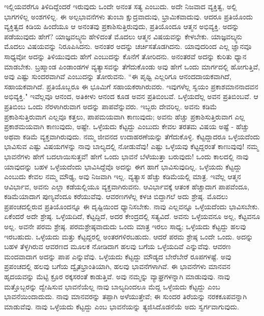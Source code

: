 \newpage

ಇಲ್ಲಿಯವರೆಗೂ ತಿಳಿದಿದ್ದೆಂದರೆ ಇರುವುದು ಒಂದೇ ಅನಂತ ಸತ್ಯ ಎಂಬುದು. ಅದೇ ನಿಜವಾದ ವ್ಯಕ್ತಿತ್ವ, ಅಲ್ಲಿ ಭಾಗಗಳಿಲ್ಲ ಅಂಶಗಳಿಲ್ಲ. ಈ ಅಲ್ಪಭಾವನೆಗಳು ತುಂಬಾ ಕ್ಷುದ್ರವಾದುವು, ಭ್ರಾಮಿಕವಾದುವು. ಆದರೂ ಪ್ರತಿಯೊಂದು ವ್ಯಕ್ತಿತ್ವದ ಕಿಡಿಯ ಹಿಂದೆಯೂ ಆ ಅನಂತವು ಪ್ರಕಾಶಿಸುತ್ತಿರುವುದು, ಪ್ರತಿಯೊಂದೂ ಆತ್ಮನ ಅಭಿವ್ಯಕ್ತಿ. ಅದನ್ನು ಪಡೆಯುವುದು ಹೇಗೆ? ಯಾಜ್ಞವಲ್ಕ್ಯನು ಹೇಳಿದಂತೆ ಮೊದಲು ಆತ್ಮನ ವಿಷಯವನ್ನು ಕೇಳಬೇಕು. ಯಾಜ್ಞವಲ್ಕ್ಯನು ಮೊದಲು ವಿಷಯವನ್ನು ನಿರೂಪಿಸಿದನು. ಅನಂತರ ಅದನ್ನು ಚರ್ಚಿಸತೊಡಗಿದನು. ಯಾವುದರಿಂದ ಎಲ್ಲ ಜ್ಞಾನವೂ ಸಾಧ್ಯವೋ ಅದನ್ನು ತಿಳಿಯುವುದು ಹೇಗೆ ಎಂಬುದನ್ನು ಕೊನೆಗೆ ತೋರಿದನು. ಅನಂತರವೆ ಅದನ್ನು ಕುರಿತು ಧ್ಯಾನ ಮಾಡಬೇಕು. ಬ್ರಹ್ಮಾಂಡ ಪಿಂಡಾಂಡಗಳ ವ್ಯತ್ಯಾಸವನ್ನು ತೆಗೆದುಕೊಂಡು ಅವು ಹೇಗೆ ಒಂದು ಮಾರ್ಗದಲ್ಲಿ ಹೋಗುತ್ತಿವೆ, ಅವು ಎಷ್ಟು ಸುಂದರವಾಗಿವೆ ಎಂಬುದನ್ನು ತೋರುವನು. “ಈ ಪೃಥ್ವಿ ಎಲ್ಲರಿಗೂ ಆನಂದದಾಯಕವಾಗಿದೆ, ಸಹಾಯಕವಾಗಿದೆ. ಪ್ರತಿಯೊಬ್ಬರೂ ಈ ಭೂಮಿಗೆ ಸಹಾಯಕರಾಗಿರುವರು. ಇವುಗಳೆಲ್ಲ ಸ್ವಯಂ ಪ್ರಕಾಶಮಾನನಾದವನ ಅಭಿವ್ಯಕ್ತಿ." ಇವೆಲ್ಲವೂ ಆನಂದ, ಅತಿಕೀಳು ಆನಂದ ಕೂಡ ಅವನ ಪ್ರತಿಬಿಂಬವೆ. ಒಳ್ಳೆಯದೆಲ್ಲ ಅವನ ಪ್ರತಿಬಿಂಬವೆ. ಆ ಪ್ರತಿಬಿಂಬ ಒಂದು ನೆರಳಾಗಿರುವಾಗ ಅದನ್ನು ಪಾಪವೆನ್ನುವರು. ಇಬ್ಬರು ದೇವರಿಲ್ಲ. ಅವನು ಕಡಿಮೆ ಪ್ರಕಾಶಿಸುತ್ತಿರುವಾಗ ಎಲ್ಲವೂ ಕತ್ತಲು, ಪಾಪಮಯವಾಗಿ ಕಾಣುವುದು; ಅವನು ಹೆಚ್ಚು ಪ್ರಕಾಶಿಸುತ್ತಿರುವಾಗ ಎಲ್ಲ ಪ್ರಕಾಶಮಯವಾಗಿ ಕಾಣುವುದು, ಅಷ್ಟೇ. ಒಳ್ಳೆಯದು ಕೆಟ್ಟದ್ದು ಎಂಬುದು ಕೇವಲ ತರತಮ ವಿಷಯ ಅಷ್ಟೆ - ಹೆಚ್ಚು ಅಥವಾ ಕಡಿಮೆ ವ್ಯಕ್ತವಾಗಿರುವುದು. ನಮ್ಮ ಜೀವನದ ಉದಾಹರಣೆಯನ್ನು ತೆಗೆದುಕೊಳ್ಳಿ. ಕೆಟ್ಟದ್ದಾದರೂ ಒಳ್ಳೆಯದೆಂದು ಭಾವಿಸುವ ಎಷ್ಟು ವಿಷಯಗಳನ್ನು ನಾವು ಬಾಲ್ಯದಲ್ಲಿ ನೋಡುವೆವು! ಎಷ್ಟು ಒಳ್ಳೆಯವು ಕೆಟ್ಟದ್ದರಂತೆ ಕಾಣುವುವು! ನಮ್ಮ ಭಾವನೆಗಳು ಹೇಗೆ ಬದಲಾಯಿಸುತ್ತವೆ! ಹೇಗೆ ಒಂದು ಭಾವನೆ ಬೆಳೆಯುತ್ತಾ ಬರುವುದು! ಒಂದು ಕಾಲದಲ್ಲಿ ನಾವು ಯಾವುದನ್ನು ಬಹಳ ಒಳ್ಳೆಯದೆಂದು ಭಾವಿಸಿದ್ದೆವೊ ಅದನ್ನು ಈಗ ಹಾಗೆ ಭಾವಿಸುವುದಿಲ್ಲ. ಒಳ್ಳೆಯದು ಕೆಟ್ಟದ್ದು ಎಂಬುದು ಕೇವಲ ನಮ್ಮ ಮೌಢ್ಯ, ಅವು ನಿಜವಾಗಿ ಇಲ್ಲ. ವ್ಯತ್ಯಾಸ ಹೆಚ್ಚು ಕಡಿಮೆಯಲ್ಲಿ ಮಾತ್ರ. ಇವೆಲ್ಲ ಆತ್ಮನ ಆವಿರ್ಭಾವ, ಅವನು ಎಲ್ಲಾ ಕಡೆಯಲ್ಲಿಯೂ ವ್ಯಕ್ತವಾಗಿರುವನು. ಆವಿರ್ಭಾವಕ್ಕೆ ಆತಂಕ ಹೆಚ್ಚಾದಾಗ ಪಾಪವೆಂದೂ, ಕಡಿಮೆಯಾದಾಗ ಪುಣ್ಯವೆಂದೂ ಕರೆಯುವೆವು. ಆವರಣಗಳೆಲ್ಲ ಕಳಚಿ ಬಿದ್ದಾಗಲೆ ಅದು ಶ್ರೇಷ್ಠ. ಮೊದಲು ಪ್ರಪಂಚದಲ್ಲಿರುವ ಪ್ರತಿಯೊಂದನ್ನೂ ಈ ದೃಷ್ಟಿಯಿಂದ ಧ್ಯಾನಿಸಬೇಕು. ನಾವು ಎಲ್ಲವನ್ನೂ ಒಳ್ಳೆಯದೆಂದು ಭಾವಿಸಬೇಕು. ಏಕೆಂದರೆ ಅದೇ ಶ್ರೇಷ್ಠ. ಒಳ್ಳೆಯದಿದೆ, ಕೆಟ್ಟದ್ದಿದೆ, ಅದರ ಕೇಂದ್ರದಲ್ಲಿ ಸತ್ಯವಿದೆ. ಅವನು ಒಳ್ಳೆಯವನೂ ಅಲ್ಲ, ಕೆಟ್ಟವನೂ ಅಲ್ಲ. ಅವನೇ ಪರಮ ಶ್ರೇಷ್ಠ. ಪರಮಶ್ರೇಷ್ಠವಾದುದು ಒಂದು ಮಾತ್ರ ಇರಲು ಸಾಧ್ಯ; ಒಳ್ಳೆಯದು ಕೆಟ್ಟದ್ದು ಹಲವು ಇರಬಹುದು. ಒಳ್ಳೆಯದು ಮತ್ತು ಕೆಟ್ಟದ್ದರಲ್ಲಿ ಅಂತರಗಳಿರಬಹುದು. ಆದರೆ ಪರಮ ಶ್ರೇಷ್ಠ ಒಂದೇ ಒಂದು. ಅದನ್ನು ಬಹಳ ತೆಳ್ಳಗಿರುವ ಆವರಣದ ಮೂಲಕ ನೋಡಿದಾಗ ಹಲವು ಬಗೆಯ ಒಳ್ಳೆಯದಿವೆ ಎನ್ನುವೆವು. ಆವರಣ ಮಂದವಾದಾಗ ಅದನ್ನು ಪಾಪ ಎನ್ನುವೆವು. ಒಳ್ಳೆಯದು ಕೆಟ್ಟದ್ದು ಮೌಡ್ಯದ ಬೇರೆಬೇರೆ ರೂಪಗಳಷ್ಟೆ. ಅವು ಪ್ರಪಂಚದಲ್ಲಿ ಹಲವು ಬಗೆಯ ದ್ವೈತಭ್ರಾಂತಿಯಾಗಿ, ಹಲವು ಭಾವನೆಗಳಾಗಿವೆ. ಈ ಭಾವನೆಗಳು ಮಾನವನ ಹೃದಯವನ್ನು ಮೆಟ್ಟಿ ಕ್ರೂರ ರಕ್ಕಸರಂತೆ ಕಾಡುತ್ತಿವೆ. ಅವು ನಮ್ಮನ್ನು ವ್ಯಾಘ್ರಗಳನ್ನಾಗಿ ಮಾಡುವುವು. ನಾವು ಮತ್ತೊಬ್ಬರನ್ನು ದ್ವೇಷಿಸುವ ಭಾವನೆಯೆಲ್ಲ ನಾವು ಬಾಲ್ಯದಿಂದಲೂ ಮೆದ್ದ ಒಳ್ಳೆಯದು ಕೆಟ್ಟದ್ದು ಎಂಬ ಭಾವನೆಯಿಂದಾದುದು. ನಾವು ಮಾನವರನ್ನು ತಪ್ಪಾಗಿ ಅಳೆಯುತ್ತೇವೆ; ಈ ಸುಂದರ ತಿರೆಯನ್ನು ನರಕಕೂಪವನ್ನಾಗಿ ಮಾಡುವೆವು. ನಾವು ಒಳ್ಳೆಯದು ಕೆಟ್ಟದ್ದು ಎಂಬ ಭಾವನೆಯನ್ನು ತ್ಯಜಿಸಿದೊಡನೆಯೆ ಅದು ಸ್ವರ್ಗವಾಗುವುದು.

